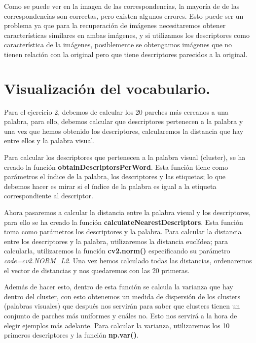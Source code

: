 	\vspace{0.06in}
	Como se puede ver en la imagen de las correspondencias, la mayoría de de las correspondencias son correctas, pero existen algunos errores. Esto puede ser un problema ya que para la recuperación de imágenes necesitaremos obtener características similares en ambas imágenes, y si utilizamos los descriptores como característica de la imágenes, posiblemente se obtengamos imágenes que no tienen relación con la original pero que tiene descriptores parecidos a la original.
	
	\section[Ejercicio 2]{Visualización del vocabulario.}
	Para el ejercicio 2, debemos de calcular los 20 parches más cercanos a una palabra, para ello, debemos calcular que descriptores pertenecen a la palabra y una vez que hemos obtenido los descriptores, calcularemos la distancia que hay entre ellos y la palabra visual.
	
	\vspace{0.06in}
	Para calcular los descriptores que pertenecen a la palabra visual (cluster), se ha creado la función \textbf{obtainDescriptorsPerWord}. Esta función tiene como parámetros el índice de la palabra, los descriptores y las etiquetas; lo que debemos hacer es mirar si el índice de la palabra es igual a la etiqueta correspondiente al descriptor.
	
	\vspace{0.06in}
	Ahora pasaremos a calcular la distancia entre la palabra visual y los descriptores, para ello se ha creado la función \textbf{calculateNearestDescriptors}. Esta función toma como parámetros los descriptores y la palabra. Para calcular la distancia entre los descriptores y la palabra, utilizaremos la distancia euclídea; para calcularla, utilizaremos la función \textbf{cv2.norm()} especificando su parámetro \textit{code=cv2.NORM\_L2}. Una vez hemos calculado todas las distancias, ordenaremos el vector de distancias y nos quedaremos con las 20 primeras.
	
	\vspace{0.06in}
	Además de hacer esto, dentro de esta función se calcula la varianza que hay dentro del cluster, con esto obtenemos un medida de dispersión de los clusters (palabras visuales) que después nos servirán para saber que clusters tienen un conjunto de parches más uniformes y cuáles no. Esto nos servirá a la hora de elegir ejemplos más adelante. Para calcular la varianza, utilizaremos los 10 primeros descriptores y la función \textbf{np.var()}.
	
